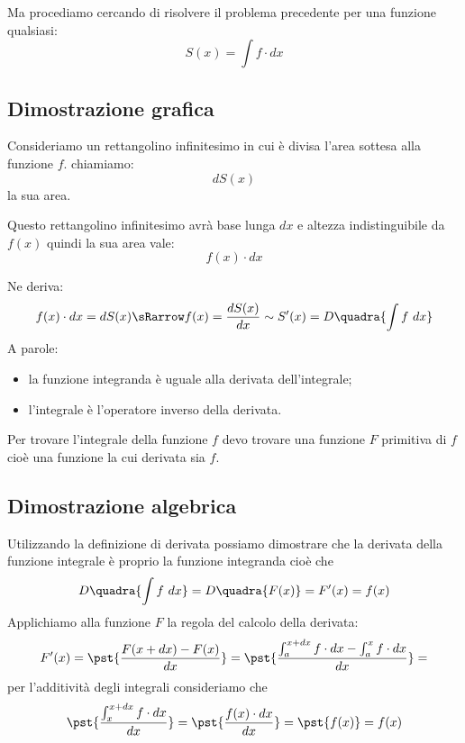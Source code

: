 Ma procediamo cercando di risolvere il problema precedente per una funzione 
qualsiasi: 
\[S(x) = \int f \cdot dx\]

\subsection{Dimostrazione grafica}

\begin{minipage}{.49 \textwidth}
Consideriamo un rettangolino infinitesimo in cui è divisa l'area sottesa alla 
funzione \(f\). chiamiamo:
\[d S(x)\]
la sua area. 

Questo rettangolino infinitesimo avrà base lunga \(dx\) e 
altezza indistinguibile da \(f(x)\) quindi la sua area vale:
\[f(x) \cdot dx\]
\end{minipage}
\hfill
\begin{minipage}{.49 \textwidth}
\begin{inaccessibleblock}[]  
  \begin{center} \teoremafonda \end{center}
\end{inaccessibleblock}
\end{minipage}

Ne deriva:
\[f(x) \cdot dx = d S(x) \sRarrow f(x) = \frac{d S(x)}{dx} \sim S'(x) =
  D\quadra{\int f~dx}\]
A parole: 
\begin{itemize} [nosep]
 \item la funzione integranda è uguale alla derivata dell'integrale;
 \item l'integrale è l'operatore inverso della derivata.
\end{itemize}

Per trovare l'integrale della funzione \(f\) devo trovare una funzione 
\(F\) primitiva di \(f\) cioè una funzione la cui derivata sia \(f\).

\subsection{Dimostrazione algebrica}

Utilizzando la definizione di derivata possiamo
dimostrare che la derivata della funzione integrale è proprio la 
funzione integranda cioè che  
\[D\quadra{\int f~dx} = D\quadra{F(x)} = F'(x) = f(x)\]
Applichiamo alla funzione \(F\) la regola del calcolo della derivata:
\[F'(x) = \pst{\frac{F(x+dx)-F(x)}{dx}} = 
\pst{\frac{\int_a^{x+dx} f \cdot dx - \int_a^x f \cdot dx}{dx}} =\] 
per l'additività degli integrali consideriamo che
\[\pst{\frac{\int_x^{x+dx} f \cdot dx}{dx}} = 
    \pst{\frac{f(x) \cdot dx}{dx}} = \pst{f(x)} = f(x)\]

